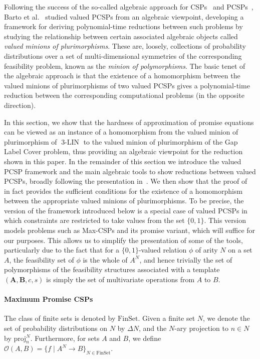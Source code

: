 \documentclass[a4paper,11pt]{article}
\theoremstyle{definition}
\newcommand{\proj}[2]{\mathrm{proj}^{#1}_{#2}}
\newcommand{\bfa}{\mathbf{A}}
\newcommand{\bfb}{\mathbf{B}}
\newcommand{\abcs}{(\bfa,\bfb,c,s)}
\newcommand{\eq}{\ensuremath{\operatorname{3-LIN}}}
\newcommand{\FinSet}{\mathrm{FinSet}}
\begin{document}
Following the success of the so-called  algebraic approach for
CSPs~\cite{JeavonsCG97,BulatovJK05} and PCSPs~\cite{BBKO21}, Barto et
al.~\cite{Barto24:lics} studied valued PCSPs from an algebraic viewpoint,
developing a framework for deriving polynomial-time reductions between such problems
by studying the relationship between certain associated algebraic objects called \emph{valued minions of plurimorphisms}. These are, loosely, collections of probability distributions over a set of multi-dimensional symmetries of the corresponding feasibility problem, known as the \emph{minion of polymorphisms}. The basic tenet of the algebraic approach is that the existence of a homomorphism between the valued minions of plurimorphisms of two valued PCSPs gives a polynomial-time reduction between the corresponding computational problems (in the opposite direction). 

\medskip
In this section, we show that the hardness of approximation of promise equations can be viewed as an instance of a homomorphism from the valued minion of plurimorphism of $\eq$ to the valued minion of plurimorphism of the Gap Label Cover problem, thus providing an algebraic viewpoint for the reduction shown in this paper.
In the remainder of this section we introduce the valued PCSP framework and the main algebraic tools to show reductions between valued PCSPs, broadly following the presentation in~\cite{Barto24:lics}. We then show that the proof of~ in fact provides the sufficient conditions for the existence of a homomorphism between the appropriate valued minions of plurimorphisms.
To be precise, the version of the framework introduced below is a special case
of valued PCSPs in which constraints are restricted to take values from the set
$\{0, 1\}$. This version models problems such as Max-CSPs and its promise
variant, which will suffice for our purposes.
This allows us to simplify the presentation of some of the tools, particularly
due to the fact that for a $\{0,1\}$-valued relation $\phi$ of arity $N$ on a
set $A$, the feasibility set of $\phi$ is the whole of $A^N$, and hence trivially the set of polymorphisms of the feasibility structures associated with a template $\abcs$ is simply the set of multivariate operations from $A$ to $B$. 

\paragraph{Maximum Promise CSPs}

The class of finite sets is denoted by $\FinSet$. Given a finite set $N$, we denote the set of probability distributions on $N$ by $\Delta N$, and the $N$-ary projection to $n\in N$ by $\proj{N}{n}$. Furthermore, for sets $A$ and $B$, we define $\mathscr{O}(A,B)=\{f \mid A^N\to B\}_{N \in \FinSet}$. 
\end{document}
